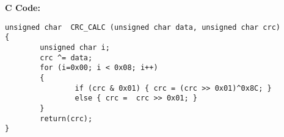 \vskip 0.1in
\textbf{C Code:}
\begin{mdframed}
\begin{lstlisting}
unsigned char  CRC_CALC (unsigned char data, unsigned char crc) 
{ 
        unsigned char i;
        crc ^= data;
        for (i=0x00; i < 0x08; i++)
        {
                if (crc & 0x01) { crc = (crc >> 0x01)^0x8C; }
                else { crc =  crc >> 0x01; }
        }
        return(crc);
}
\end{lstlisting}
\end{mdframed}